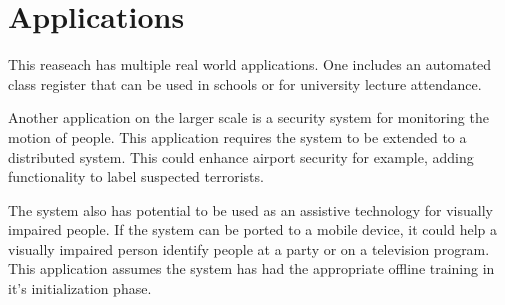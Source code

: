 \section{Applications}
  This reaseach has multiple real world applications.
  One includes an automated class register that can be used in schools or for university lecture attendance.

  Another application on the larger scale is a security system for monitoring the motion of people.
  This application requires the system to be extended to a distributed system.
  This could enhance airport security for example, adding functionality to label suspected terrorists.

  The system also has potential to be used as an assistive technology for visually impaired people.
  If the system can be ported to a mobile device, it could help a visually impaired person identify people at a party or on a television program.
  This application assumes the system has had the appropriate offline training in it's initialization phase.
